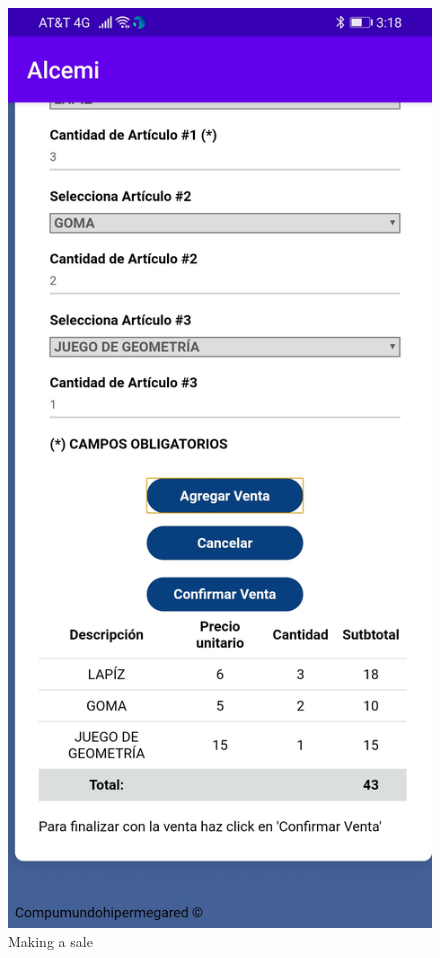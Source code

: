 \documentclass{article}
\begin{document}
\pagebreak

\begin{figure}[h]
\caption {Making a sale}
\centering
\includegraphics[scale=0.16]{fig14}
\end{figure}
\end{document}
